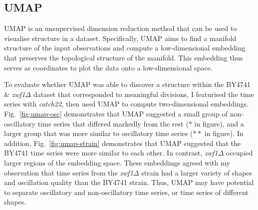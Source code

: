 \subsection{UMAP}
\label{subsec:analysis-clustering-umap}

UMAP \parencite{mcinnesUMAPUniformManifold2020} is an unsupervised dimension reduction method that can be used to visualise structure in a dataset.
Specifically, UMAP aims to find a manifold structure of the input observations and compute a low-dimensional embedding that preserves the topological structure of the manifold.
This embedding thus serves as coordinates to plot the data onto a low-dimensional space.

To evaluate whether UMAP was able to discover a structure within the BY4741 \& \textit{zwf1$\Delta$} dataset that corresponded to meaningful divisions, I featurised the time series with \textit{catch22}, then used UMAP to compute two-dimensional embeddings.
Fig.\ \ref{fig:umap-osc} demonstrates that UMAP suggested a small group of non-oscillatory time series that differed markedly from the rest ($\ast$ in figure), and a larger group that was more similar to oscillatory time series ($\ast \ast$ in figure).
In addition, Fig.\ \ref{fig:umap-strain} demonstrates that UMAP suggested that the BY4741 time series were more similar to each other.
In contrast, \textit{zwf1$\Delta$} occupied larger regions of the embedding space.
These embeddings agreed with my observation that time series from the \textit{zwf1$\Delta$} strain had a larger variety of shapes and oscillation quality than the BY4741 strain.
Thus, UMAP may have potential to separate oscillatory and non-oscillatory time series, or time series of different shapes.

